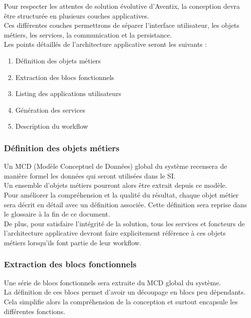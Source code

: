 Pour respecter les attentes de solution évolutive d'Aventix, la conception
devra être structurée en plusieurs couches applicatives. \\

Ces différentes couches permettrons de séparer l'interface utilisateur, les
objets métiers, les services, la communication et la persistance. \\

Les points détaillés de l'architecture applicative seront les suivants :
\begin{enumerate}
  \item Définition des objets métiers
  \item Extraction des blocs fonctionnels
  \item Listing des applications utilisateurs
  \item Génération des services
  \item Description du workflow
\end{enumerate}

\subsubsection{Définition des objets métiers}
Un MCD (Modèle Conceptuel de Données) global du système recensera de manière
formel les données qui seront utilisées dans le SI. \\

Un ensemble d'objets métiers pourront alors être extrait depuis ce modèle. \\

Pour améliorer la compréhension et la qualité du résultat, chaque objet métier
sera décrit en détail avec un définition associée. Cette définition sera
reprise dans le glossaire à la fin de ce document. \\

De plus, pour satisfaire l'intégrité de la solution, tous les services et
foncteurs de l'architecture applicative devront faire explicitement référence à
ces objets métiers lorsqu'ils font partie de leur workflow. \\

\subsubsection{Extraction des blocs fonctionnels}
Une série de blocs fonctionnels sera extraite du MCD global du système. \\

La définition de ces blocs permet d'avoir un découpage en blocs peu dépendants.
Cela simplifie alors la compréhension de la conception et surtout encapsule les
différentes fonctions. \\

